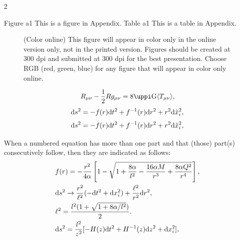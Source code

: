 \documentclass[fleqn]{2026SCGE}
\begin{document}
\begin{multicols}{2}
\begin{appendix}
Figure a1  This is a figure in Appendix.
Table a1  This is a table in Appendix.
\begin{figure}[H]%
	\centering
	\caption{(Color online) This figure will appear in color only in the online version only, not in the printed version. Figures should be created at 300 dpi and submitted at 300 dpi for the best presentation. Choose RGB (red, green, blue) for any figure that will appear in color only online.}\label{fig:example22} %
\end{figure}


\begin{equation}\label{eq:a1}
	R_{\mu \nu } -\frac{1}{2}Rg_{\mu \nu}=8\uppi \textmd{G}\langle T_{\mu \nu}\rangle,
\end{equation}
\begin{equation}\label{eq:a2}
	\textmd{d}s^{2}=-f(r)\textmd{d}t^{2}+f^{-1}(r)\textmd{d}r^{2}+r^{2}\textmd{d}\tilde{x}_i^{2},
\end{equation}
\begin{equation}\label{eq:a3}
	\textmd{d}s^{2}=-f(r)\textmd{d}t^{2}+f^{-1}(r)\textmd{d}r^{2}+r^{2}\textmd{d}\tilde{x}_i^{2},
\end{equation}

When a numbered equation has more than one part and that (those) part(s) consecutively follow, then they are indicated as follows:
\begin{subequations}
	\begin{align}
		&f(r)=-\frac{r^2}{4\alpha}\left[1-\sqrt{1+\frac{8\alpha}{l^2}-\frac{16\alpha  M}{r^3}+\frac{8\alpha Q^2}{r^4}}\right], \\
		&\textmd{d}s^2\rightarrow \frac{r^2}{\ell^2}(-\textmd{d}t^2+\textmd{d}x_i^2)+\frac{\ell^2}{r^2}\textmd{d}r^2,
		\\
		&\ell^2=\frac{l^2(1+\sqrt{1+8\alpha/l^2})}{2}.\label{metric}
		\\
		&\textmd{d}s^{2}=\frac{l^2}{z^2}[-H(z)\textmd{d}t^{2}+H^{-1}(z)\textmd{d}z^{2}+\textmd{d}x_i^2],
	\end{align}\label{eq:4}
\end{subequations}



\end{appendix}
\end{multicols}
\end{document}
